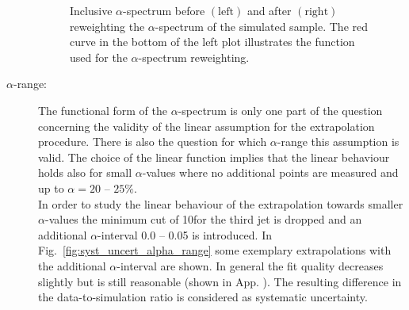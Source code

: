 \begin{description}
\begin{figure}[tp]
\begin{tabular}{cc}
  \end{tabular}
  \caption{Inclusive $\alpha$-spectrum before $(\mathrm{left})$ and after $(\mathrm{right})$ reweighting the $\alpha$-spectrum of the simulated sample. The red curve in the bottom of the left plot illustrates the function used for the $\alpha$-spectrum reweighting.}
  \label{fig:syst_uncert_alpha_spec}
\end{figure}
 
 \item[$\alpha$-range:] The functional form of the $\alpha$-spectrum is only one part of the question concerning the validity of the linear assumption for the extrapolation procedure. There is also the question for which $\alpha$-range this assumption is valid. The choice of the linear function implies that the linear behaviour holds also for small $\alpha$-values where no additional points are measured and up to $\alpha=20$ -- $25\%$. \\
In order to study the linear behaviour of the extrapolation towards smaller $\alpha$-values the minimum \pt cut of 10\gev for the third jet is dropped and an additional $\alpha$-interval 0.0 -- 0.05 is introduced. In Fig.~\ref{fig:syst_uncert_alpha_range} some exemplary extrapolations with the additional $\alpha$-interval are shown. In general the fit quality decreases slightly but is still reasonable (shown in App. ). The resulting difference in the data-to-simulation ratio is considered as systematic uncertainty.


\end{description}
